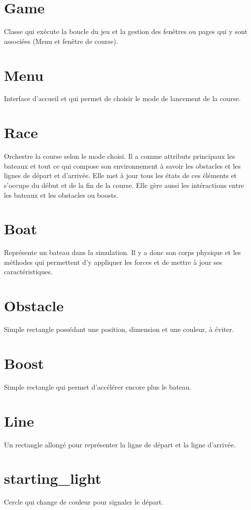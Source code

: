 \documentclass[a4paper,margin=1cm,11pt]{report}
\begin{document}
\section{Game}
Classe qui exécute la boucle du jeu et la gestion des fenêtres ou pages qui y sont associées (Menu et fenêtre de course).

\section{Menu}
Interface d’accueil et qui permet de choisir le mode de lancement de la course.

\section{Race}
Orchestre la course selon le mode choisi. Il a comme attributs principaux les bateaux et tout ce qui compose son environnement à savoir les obstacles et les lignes de départ et d’arrivée.
Elle met à jour tous les états de ces éléments et s’occupe du début et de la fin de la course. Elle gère aussi les intéractions entre les bateaux et les obstacles ou boosts.


\section{Boat}
Représente un bateau dans la simulation. Il y a donc son corps physique et les méthodes qui permettent d’y appliquer les forces et de mettre à jour ses caractéristiques.

\section{Obstacle}
Simple rectangle possédant une position, dimension et une couleur, à éviter.

\section{Boost}
Simple rectangle qui permet d’accélérer encore plus le bateau.

\section{Line}
Un rectangle allongé pour représenter la ligne de départ et la ligne d’arrivée.

\section{starting\_light}
Cercle qui change de couleur pour signaler le départ.
\end{document}
